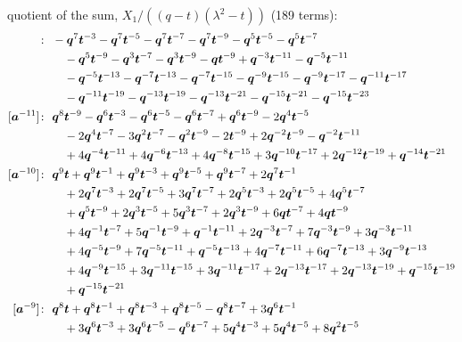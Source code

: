 quotient of the sum, $X_1/((q - t)(\lambda^2 - t))$ (189 terms):
\begin{align*}
[\ba^{-12}]\colon\ & -\bq^{7} \bt^{-3} -\bq^{7} \bt^{-5} -\bq^{7} \bt^{-7} -\bq^{7} \bt^{-9} -\bq^{5} \bt^{-5} -\bq^{5} \bt^{-7} \\
& \quad -\bq^{5} \bt^{-9} -\bq^{3} \bt^{-7} -\bq^{3} \bt^{-9} -\bq \bt^{-9} +\bq^{-3} \bt^{-11} -\bq^{-5} \bt^{-11} \\
& \quad -\bq^{-5} \bt^{-13} -\bq^{-7} \bt^{-13} -\bq^{-7} \bt^{-15} -\bq^{-9} \bt^{-15} -\bq^{-9} \bt^{-17} -\bq^{-11} \bt^{-17} \\
& \quad -\bq^{-11} \bt^{-19} -\bq^{-13} \bt^{-19} -\bq^{-13} \bt^{-21} -\bq^{-15} \bt^{-21} -\bq^{-15} \bt^{-23} \\
[\ba^{-11}]\colon\ & \bq^{8} \bt^{-9} -\bq^{6} \bt^{-3} -\bq^{6} \bt^{-5} -\bq^{6} \bt^{-7} +\bq^{6} \bt^{-9} -2 \bq^{4} \bt^{-5} \\
& \quad -2 \bq^{4} \bt^{-7} -3 \bq^{2} \bt^{-7} -\bq^{2} \bt^{-9} -2 \bt^{-9} +2 \bq^{-2} \bt^{-9} -\bq^{-2} \bt^{-11} \\
& \quad +4 \bq^{-4} \bt^{-11} +4 \bq^{-6} \bt^{-13} +4 \bq^{-8} \bt^{-15} +3 \bq^{-10} \bt^{-17} +2 \bq^{-12} \bt^{-19} +\bq^{-14} \bt^{-21} \\
[\ba^{-10}]\colon\ & \bq^{9} \bt +\bq^{9} \bt^{-1} +\bq^{9} \bt^{-3} +\bq^{9} \bt^{-5} +\bq^{9} \bt^{-7} +2 \bq^{7} \bt^{-1} \\
& \quad +2 \bq^{7} \bt^{-3} +2 \bq^{7} \bt^{-5} +3 \bq^{7} \bt^{-7} +2 \bq^{5} \bt^{-3} +2 \bq^{5} \bt^{-5} +4 \bq^{5} \bt^{-7} \\
& \quad +\bq^{5} \bt^{-9} +2 \bq^{3} \bt^{-5} +5 \bq^{3} \bt^{-7} +2 \bq^{3} \bt^{-9} +6 \bq \bt^{-7} +4 \bq \bt^{-9} \\
& \quad +4 \bq^{-1} \bt^{-7} +5 \bq^{-1} \bt^{-9} +\bq^{-1} \bt^{-11} +2 \bq^{-3} \bt^{-7} +7 \bq^{-3} \bt^{-9} +3 \bq^{-3} \bt^{-11} \\
& \quad +4 \bq^{-5} \bt^{-9} +7 \bq^{-5} \bt^{-11} +\bq^{-5} \bt^{-13} +4 \bq^{-7} \bt^{-11} +6 \bq^{-7} \bt^{-13} +3 \bq^{-9} \bt^{-13} \\
& \quad +4 \bq^{-9} \bt^{-15} +3 \bq^{-11} \bt^{-15} +3 \bq^{-11} \bt^{-17} +2 \bq^{-13} \bt^{-17} +2 \bq^{-13} \bt^{-19} +\bq^{-15} \bt^{-19} \\
& \quad +\bq^{-15} \bt^{-21} \\
[\ba^{-9}]\colon\ & \bq^{8} \bt +\bq^{8} \bt^{-1} +\bq^{8} \bt^{-3} +\bq^{8} \bt^{-5} -\bq^{8} \bt^{-7} +3 \bq^{6} \bt^{-1} \\
& \quad +3 \bq^{6} \bt^{-3} +3 \bq^{6} \bt^{-5} -\bq^{6} \bt^{-7} +5 \bq^{4} \bt^{-3} +5 \bq^{4} \bt^{-5} +8 \bq^{2} \bt^{-5} \\

\end{align*}
